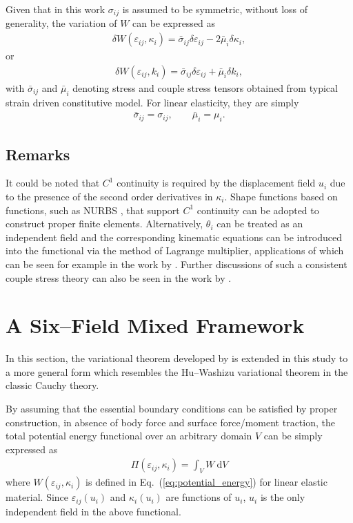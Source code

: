 \documentclass[3p,sort&compress,11pt,fleqn]{elsarticle}
\newcommand*{\eqsref}[1]{Eq.~(\ref{#1})}
\newcommand*{\md}[1]{\mathrm{d}#1}
\begin{document}
Given that in this work $\sigma_{ij}$ is assumed to be symmetric, without loss of generality, the variation of $W$ can be expressed as
\begin{gather}\label{eq:potential_energy}
\delta{}W\left(\varepsilon_{ij},\kappa_i\right)=\bar{\sigma}_{ij}\delta\varepsilon_{ij}-2\bar{\mu}_{i}\delta\kappa_i,
\end{gather}
or
\begin{gather}
\delta{}W\left(\varepsilon_{ij},k_i\right)=\bar{\sigma}_{ij}\delta\varepsilon_{ij}+\bar{\mu}_{i}\delta{}k_i,
\end{gather}
with $\bar{\sigma}_{ij}$ and $\bar{\mu}_{i}$ denoting stress and couple stress tensors obtained from typical strain driven constitutive model. For linear elasticity, they are simply
\begin{gather*}
\bar{\sigma}_{ij}=\sigma_{ij},\qquad\bar{\mu}_{i}=\mu_{i}.
\end{gather*}
\subsection{Remarks}
It could be noted that $C^1$ continuity is required by the displacement field $u_i$ due to the presence of the second order derivatives in $\kappa_i$. Shape functions based on functions, such as NURBS \citep[see][]{Dargush2021}, that support $C^1$ continuity can be adopted to construct proper finite elements. Alternatively, $\theta_i$ can be treated as an independent field and the corresponding kinematic equations can be introduced into the functional via the method of Lagrange multiplier, applications of which can be seen for example in the work by \citet{Darrall2013,Deng2016,Pedgaonkar2021}. Further discussions of such a consistent couple stress theory can also be seen in the work by \citet{Hadjesfandiari2016}.
\section{A Six--Field Mixed Framework}
In this section, the variational theorem developed by \citet{Darrall2013} is extended in this study to a more general form which resembles the Hu--Washizu variational theorem in the classic Cauchy theory.

By assuming that the essential boundary conditions can be satisfied by proper construction, in absence of body force and surface force/moment traction, the total potential energy functional over an arbitrary domain $V$ can be simply expressed as
\begin{gather}
\varPi\left(\varepsilon_{ij},\kappa_i\right)=\int_VW~\md{V}
\end{gather}
where $W\left(\varepsilon_{ij},\kappa_i\right)$ is defined in \eqsref{eq:potential_energy} for linear elastic material. Since $\varepsilon_{ij}\left(u_i\right)$ and $\kappa_i\left(u_i\right)$ are functions of $u_i$, $u_i$ is the only independent field in the above functional.
\end{document}
